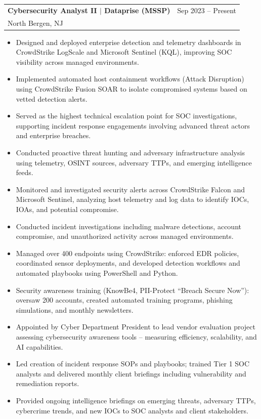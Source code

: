 \documentclass[A4]{article}
\makeatletter
\newcommand{\CVItem}[1]{
  \item\small{
    {#1 \vspace{-2pt}}
  }
}
\newcommand{\CVSubheading}[4]{
  \vspace{-4pt}\item
    \begin{tabular*}{0.97\textwidth}[t]{l@{\extracolsep{\fill}}r}
      \textbf{#1} & #2 \\
      \small#3 & \small #4 \\
    \end{tabular*}\vspace{-7pt}
}
\newcommand{\CVItemListStart}{\begin{itemize}}
\newcommand{\CVItemListEnd}{\end{itemize}\vspace{-5pt}}
\makeatother
\begin{document}
    \CVSubheading
      {Cybersecurity Analyst II $|$ Dataprise (MSSP)}{Sep 2023 -- Present}
      {North Bergen, NJ}{}
      \CVItemListStart
        \CVItem{Designed and deployed enterprise detection and telemetry dashboards in CrowdStrike LogScale and Microsoft Sentinel (KQL), improving SOC visibility across managed environments.}
        \CVItem{Implemented automated host containment workflows (Attack Disruption) using CrowdStrike Fusion SOAR to isolate compromised systems based on vetted detection alerts.}
        \CVItem{Served as the highest technical escalation point for SOC investigations, supporting incident response engagements involving advanced threat actors and enterprise breaches.}
        \CVItem{Conducted proactive threat hunting and adversary infrastructure analysis using telemetry, OSINT sources, adversary TTPs, and emerging intelligence feeds.}
        \CVItem{Monitored and investigated security alerts across CrowdStrike Falcon and Microsoft Sentinel, analyzing host telemetry and log data to identify IOCs, IOAs, and potential compromise.}
        \CVItem{Conducted incident investigations including malware detections, account compromise, and unauthorized activity across managed environments.}
        \CVItem{Managed over 400 endpoints using CrowdStrike: enforced EDR policies, coordinated sensor deployments, and developed detection workflows and automated playbooks using PowerShell and Python.}
        \CVItem{Security awareness training (KnowBe4, PII-Protect ``Breach Secure Now''): oversaw 200 accounts, created automated training programs, phishing simulations, and monthly newsletters.}
        \CVItem{Appointed by Cyber Department President to lead vendor evaluation project assessing cybersecurity awareness tools -- measuring efficiency, scalability, and AI capabilities.}
        \CVItem{Led creation of incident response SOPs and playbooks; trained Tier 1 SOC analysts and delivered monthly client briefings including vulnerability and remediation reports.}
        \CVItem{Provided ongoing intelligence briefings on emerging threats, adversary TTPs, cybercrime trends, and new IOCs to SOC analysts and client stakeholders.}
      \CVItemListEnd
\end{document}
